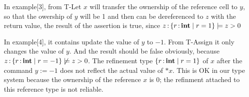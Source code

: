 \documentclass[runningheads]{llncs}
\begin{document}
\begin{parcolumns}{2}
\colplacechunks
\end{parcolumns}

In example[3], from T-Let $x$ will transfer the ownership of the reference cell to $y$, so that the
owership of $y$ will be 1 and then can be dereferenced to $z$ with the return value, the result of
the assertion is true, since $z \operatorname{:} \left\{{r \operatorname{:} \mathbf{int} \mid r = 1}\right\} \models z>0$

\begin{parcolumns}{2}
\colplacechunks
\end{parcolumns}

In example[4], it contains update the value of $y$ to $-1$. From T-Assign it only changes the value of $y$.
And the result should be false obviously, because $z \operatorname{:} \left\{{r \operatorname{:} \mathbf{int} \mid r = -1}\right\} \not\models z>0$.
The refinement type $\left\{{r \operatorname{:} \mathbf{int} \mid r = 1}\right\}$ of $x$ after the command $y := -1$ does not reflect the actual value of $*x$.
This is OK in our type system because the ownership of the reference $x$ is $0$; the refinment attached to this reference type is not reliable.
\end{document}
